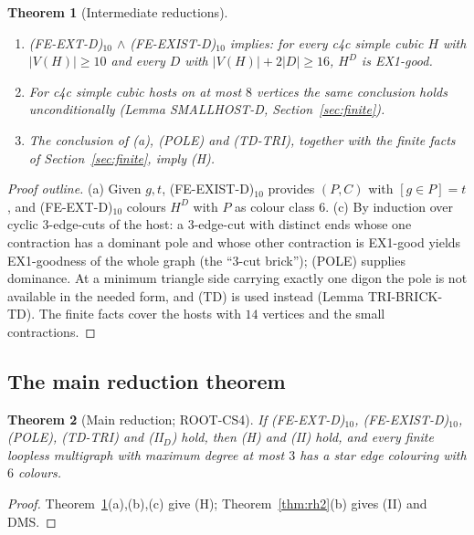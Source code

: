 \documentclass[11pt]{amsart}
\newtheorem{theorem}{Theorem}[section]
\theoremstyle{definition}
\theoremstyle{remark}
\newcommand{\hyp}[1]{\textup{(#1)}}
\begin{document}
\begin{theorem}[Intermediate reductions]\label{thm:hred}
\begin{enumerate}[label=(\alph*)]
\item \hyp{FE-EXT-D}$_{10}$ $\wedge$ \hyp{FE-EXIST-D}$_{10}$ implies: for every c4c simple cubic $H$ with $|V(H)|\ge 10$ and every $D$ with $|V(H)|+2|D|\ge 16$, $H^D$ is EX1-good.
\item For c4c simple cubic hosts on at most $8$ vertices the same conclusion holds unconditionally \textup{(Lemma SMALLHOST-D, Section~\ref{sec:finite})}.
\item The conclusion of \textup{(a)}, \hyp{POLE} and \hyp{TD-TRI}, together with the finite facts of Section~\ref{sec:finite}, imply \hyp{H}.
\end{enumerate}
\end{theorem}
\begin{proof}[Proof outline]
(a) Given $g,t$, \hyp{FE-EXIST-D}$_{10}$ provides $(P,C)$ with $[g\in P]=t$, and \hyp{FE-EXT-D}$_{10}$ colours $H^D$ with $P$ as colour class $6$. (c) By induction over cyclic $3$-edge-cuts of the host: a $3$-edge-cut with distinct ends whose one contraction has a dominant pole and whose other contraction is EX1-good yields EX1-goodness of the whole graph (the ``3-cut brick''); \hyp{POLE} supplies dominance. At a minimum triangle side carrying exactly one digon the pole is not available in the needed form, and \hyp{TD} is used instead (Lemma TRI-BRICK-TD). The finite facts cover the hosts with $14$ vertices and the small contractions.
\end{proof}

\subsection{The main reduction theorem}

\begin{theorem}[Main reduction; ROOT-CS4]\label{thm:main}
If \hyp{FE-EXT-D}$_{10}$, \hyp{FE-EXIST-D}$_{10}$, \hyp{POLE}, \hyp{TD-TRI} and \hyp{II$_D$} hold, then \hyp{H} and \hyp{II} hold, and every finite loopless multigraph with maximum degree at most $3$ has a star edge colouring with $6$ colours.
\end{theorem}
\begin{proof}
Theorem~\ref{thm:hred}(a),(b),(c) give \hyp{H}; Theorem~\ref{thm:rh2}(b) gives \hyp{II} and DMS.
\end{proof}
\end{document}
